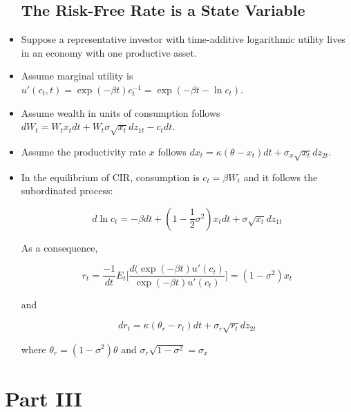 \documentclass{article}
\begin{document}
\begin{itemize}
\subsection*{The Risk-Free Rate is a State Variable}

\item Suppose a representative investor with time-additive logarithmic utility lives in an economy with one productive asset.

\item Assume marginal utility is $u'(c_t, t) = \exp(-\beta t)c_t^{-1} = \exp(-\beta t - \ln c_t)$.

\item Assume wealth in units of consumption follows $dW_t = W_t x_t dt + W_t \sigma\sqrt{x_t} dz_{1t} - c_t dt$.

\item Assume the productivity rate $x$ follows $dx_t = \kappa(\theta - x_t)dt + \sigma_x \sqrt{x_t} dz_{2t}$.

\item In the equilibrium of CIR, consumption is $c_t = \beta W_t$ and it follows the subordinated process:

$$
d \ln c_t = -\beta dt + (1 - \frac{1}{2} \sigma^2) x_t dt + \sigma \sqrt{x_t} dz_{1t}
$$

As a consequence,

$$
r_t = \frac{-1}{dt} E_t \Bigg[ \frac{d(\exp(-\beta t) u'(c_t)}{\exp(-\beta t) u'(c_t)} \Bigg] = (1 - \sigma^2) x_t
$$

and 

$$
dr_t = \kappa(\theta_r - r_t)dt + \sigma_r \sqrt{r_t} dz_{2t}
$$

where $\theta_r = (1-\sigma^2) \theta$ and $\sigma_r \sqrt{1-\sigma^2} = \sigma_x$

\end{itemize}

\section{Part III}
\end{document}
